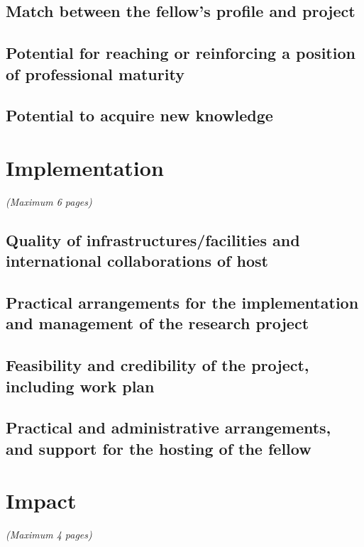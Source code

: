 \documentclass[a4paper,11pt]{article}
\newenvironment{xcomment}{\em}{}
\begin{document}
\subsection{Match between the fellow's profile and project}
\subsection{Potential for reaching or reinforcing a position of professional maturity}
\subsection{Potential to acquire new knowledge}


\section{Implementation}
\begin{xcomment}  
(Maximum 6 pages)
\end{xcomment}

\subsection{Quality of infrastructures/facilities and international collaborations of host}
\subsection{Practical arrangements for the implementation and management of the research project }
\subsection{Feasibility and credibility of the project, including work plan}
\subsection{Practical and administrative arrangements, and support for the hosting of the fellow  }


\section{Impact}
\begin{xcomment}  
(Maximum 4 pages)
\end{xcomment}
\end{document}
